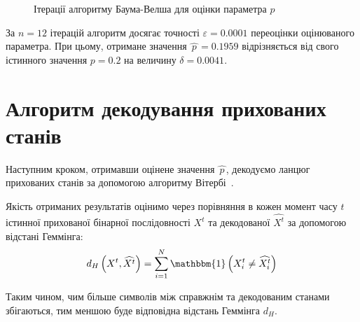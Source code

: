 \begin{figure}[H]\centering
    \setfontsize{14pt}
    \caption{Ітерації алгоритму Баума-Велша для оцінки параметра $p$}
    \label{pic: p baum-welch learning algorithm}
\end{figure}

За $n=12$ ітерацій алгоритм досягає точності $\varepsilon=0.0001$ переоцінки оцінюваного параметра. При цьому, отримане значення $\widehat{\,p\,}=0.1959$ відрізняється від свого істинного значення $p=0.2$ на величину $\delta=0.0041$.

\section{Алгоритм декодування прихованих станів}

Наступним кроком, отримавши оцінене значення $\widehat{\,p\,}$, декодуємо ланцюг прихованих станів за допомогою алгоритму Вітербі~\cite[розділ 6]{Nilsson2005}. 

Якість отриманих результатів оцінимо через порівняння в кожен момент часу $t$ істинної прихованої бінарної послідовності $X^t$ та декодованої $\widehat{X^t}$ за допомогою відстані Геммінга:
\begin{equation*}
    d_H\left( X^t,\widehat{X^t} \right) = \sum_{i=1}^{N} \mathbbm{1}\left( X^t_i \neq \widehat{X^t_i} \right)
\end{equation*} 

Таким чином, чим більше символів між справжнім та декодованим станами збігаються, тим меншою буде відповідна відстань Геммінга $d_H$. 

